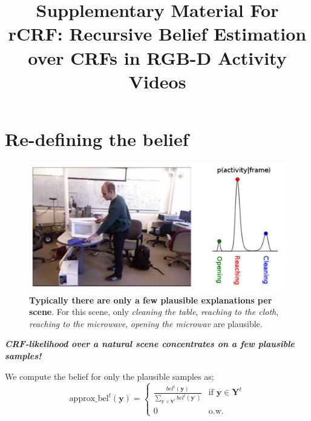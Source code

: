 \documentclass[conference]{IEEEtran}
\begin{document}
\title{Supplementary Material For \\ rCRF: Recursive Belief Estimation over CRFs in RGB-D Activity Videos}

\author{
\and
{}
}


\maketitle

\IEEEpeerreviewmaketitle

\section{Re-defining the belief}
\begin{figure}[h!]
  \includegraphics[width=\linewidth]{fig2}
  \caption{\textbf{Typically there are only a few plausible explanations per scene}. For this scene, only \emph{cleaning the table}, \emph{reaching to the cloth}, \emph{reaching to the microwave}, \emph{opening the microwav} are plausible.
}
\end{figure}

\textbf{\emph{CRF-likelihood over a natural scene concentrates on a few plausible samples!}}
\vspace{5mm}

We compute the belief for only the plausible samples as;
\begin{equation}
  \text{approx\_bel}^t(\mathbf{y})=\left\{ \begin{array}{cc} \frac{bel^t(\mathbf{y})}{\sum_{\mathbf{y}^\prime \in \mathbf{Y}^t} bel^t(\mathbf{y}^\prime)} & \text{if $\mathbf{y} \in \mathbf{Y}^t$} \\ 0 & \text{o.w.} \end{array} \right.
\end{equation}
\end{document}
